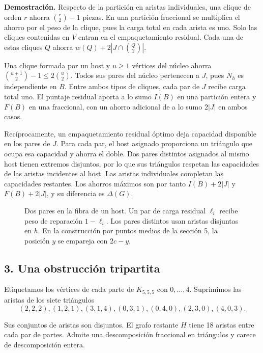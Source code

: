 \documentclass[spanish,11pt,a4paper]{article}
\begin{document}
\textbf{Demostración.} Respecto de la partición en aristas individuales, una clique de orden \(r\) ahorra \(\binom r2-1\) piezas. En una partición fraccional se multiplica el ahorro por el peso de la clique, pues la carga total en cada arista es uno. Solo las cliques contenidas en \(V\) entran en el empaquetamiento residual. Cada una de estas cliques \(Q\) ahorra \(w(Q)+2|J\cap\binom Q2|\).

Una clique formada por un host y \(u\ge1\) vértices del núcleo ahorra \(\binom{u+1}2-1\le2\binom u2\). Todos sus pares del núcleo pertenecen a \(J\), pues \(N_h\) es independiente en \(B\). Entre ambos tipos de cliques, cada par de \(J\) recibe carga total uno. El puntaje residual aporta a lo sumo \(I(B)\) en una partición entera y \(F(B)\) en una fraccional, con un ahorro adicional de a lo sumo \(2|J|\) en ambos casos.

Recíprocamente, un empaquetamiento residual óptimo deja capacidad disponible en los pares de \(J\). Para cada par, el host asignado proporciona un triángulo que ocupa esa capacidad y ahorra el doble. Dos pares distintos asignados al mismo host tienen extremos disjuntos, por lo que sus triángulos respetan las capacidades de las aristas incidentes al host. Las aristas individuales completan las capacidades restantes. Los ahorros máximos son por tanto \(I(B)+2|J|\) y \(F(B)+2|J|\), y su diferencia es \(\Delta(G)\).

\begin{figure}[htbp]
\centering
\caption{Dos pares en la fibra de un host. Un par de carga residual $\ell_i$ recibe peso de reparación $1-\ell_i$. Los pares distintos usan aristas disjuntas en $h$. En la construcción por puntos medios de la sección 5, la posición $y$ se empareja con $2c-y$.}\label{fig:host-fiber}
\end{figure}

\subsection{3. Una obstrucción tripartita}\label{una-obstrucciuxf3n-tripartita}

Etiquetamos los vértices de cada parte de \(K_{5,5,5}\) con \(0,\ldots,4\). Suprimimos las aristas de los siete triángulos
\[(2,2,2),(1,2,1),(3,1,4),(0,3,1),(0,4,0),(2,3,0),(4,0,3).\]

Sus conjuntos de aristas son disjuntos. El grafo restante \(H\) tiene 18 aristas entre cada par de partes. Admite una descomposición fraccional en triángulos y carece de descomposición entera.
\end{document}

